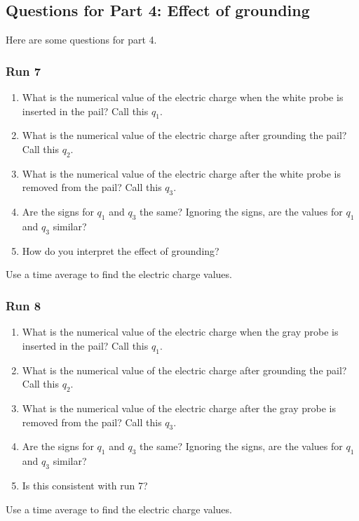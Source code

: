 \subsection{Questions for Part 4: Effect of grounding}
Here are some questions for part 4.
\subsubsection{Run 7}
\begin{enumerate}
	\item What is the numerical value of the electric charge when the white probe is inserted in the pail? Call this $q_{1}$.
	\item What is the numerical value of the electric charge after grounding the pail? Call this $q_{2}$.
	\item What is the numerical value of the electric charge after the white probe is removed from the pail? Call this $q_{3}$.
	\item Are the signs for $q_{1}$ and $q_{3}$ the same? Ignoring the signs, are the values for $q_{1}$ and $q_{3}$ similar?
	\item How do you interpret the effect of grounding?
\end{enumerate}
Use a time average to find the electric charge values.
\subsubsection{Run 8}
\begin{enumerate}
	\item What is the numerical value of the electric charge when the gray probe is inserted in the pail? Call this $q_{1}$.
	\item What is the numerical value of the electric charge after grounding the pail? Call this $q_{2}$.
	\item What is the numerical value of the electric charge after the gray probe is removed from the pail? Call this $q_{3}$.
	\item Are the signs for $q_{1}$ and $q_{3}$ the same? Ignoring the signs, are the values for $q_{1}$ and $q_{3}$ similar?
	\item Is this consistent with run 7?
\end{enumerate}
Use a time average to find the electric charge values.
